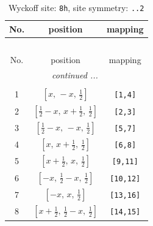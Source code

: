 \documentclass[fleqn,8pt]{jsarticle}
\begin{document}
\begin{longtable}{ccc}
\caption{Wyckoff site: {\tt 8h}, site symmetry: {\tt ..2}}
 \\
 \hline \hline
No. & position & mapping \\ \hline \endfirsthead

\multicolumn{2}{l}{\tablename\ \thetable{}} \\
 \hline \hline
No. & position & mapping \\ \hline \endhead

 \hline \hline
\multicolumn{2}{r}{\footnotesize\it continued ...} \\ \endfoot

 \hline \hline
\multicolumn{2}{r}{} \\ \endlastfoot

1 & $\left[ x,\, - x,\, \frac{1}{2} \right]$ & {\tt [1,4]} \\ \hline
2 & $\left[ \frac{1}{2} - x,\, x + \frac{1}{2},\, \frac{1}{2} \right]$ & {\tt [2,3]} \\ \hline
3 & $\left[ \frac{1}{2} - x,\, - x,\, \frac{1}{2} \right]$ & {\tt [5,7]} \\ \hline
4 & $\left[ x,\, x + \frac{1}{2},\, \frac{1}{2} \right]$ & {\tt [6,8]} \\ \hline
5 & $\left[ x + \frac{1}{2},\, x,\, \frac{1}{2} \right]$ & {\tt [9,11]} \\ \hline
6 & $\left[ - x,\, \frac{1}{2} - x,\, \frac{1}{2} \right]$ & {\tt [10,12]} \\ \hline
7 & $\left[ - x,\, x,\, \frac{1}{2} \right]$ & {\tt [13,16]} \\ \hline
8 & $\left[ x + \frac{1}{2},\, \frac{1}{2} - x,\, \frac{1}{2} \right]$ & {\tt [14,15]} \\
\end{longtable}
\renewcommand{\arraystretch}{1.2}
\end{document}

